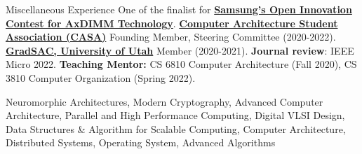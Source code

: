 \begin{rubric}{Miscellaneous Experience}
\entry*[ ] One of the finalist for \textbf{\href{https://www.samsung.com/semiconductor/newsroom/events/open-innovation-contest/#finalists}{Samsung's Open Innovation Contest for AxDIMM Technology}}.
%
\entry*[ ] \textbf{\href{https://www.sigarch.org/casa/}{Computer Architecture Student Association (CASA)}} Founding Member, Steering Committee (2020-2022).
% 
\entry*[ ] \textbf{\href{http://wiki.cs.utah.edu/gradsac}{GradSAC, University of Utah}} Member (2020-2021).
% 
\entry*[ ] \textbf{Journal review}: IEEE Micro 2022.
% 
\entry*[ ] \textbf{Teaching Mentor:} CS 6810 Computer Architecture (Fall 2020), CS 3810 Computer Organization (Spring 2022).

\entry*[ ] Neuromorphic Architectures, Modern Cryptography, Advanced Computer Architecture, Parallel and High Performance Computing, Digital VLSI Design, Data Structures \& Algorithm for Scalable Computing,  Computer Architecture, Distributed Systems, Operating System, Advanced Algorithms

\end{rubric}